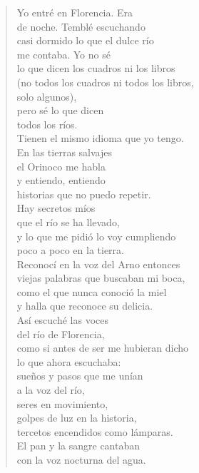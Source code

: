 \documentclass[12pt]{article}
\begin{document}
\clearpage
{}
\begin{verse}

Yo entré en Florencia. Era\\
de noche. Temblé escuchando\\
casi dormido lo que el dulce río\\
me contaba. Yo no sé\\
lo que dicen los cuadros ni los libros\\
(no todos los cuadros ni todos los libros,\\
solo algunos),\\
pero sé lo que dicen\\
todos los ríos.\\
Tienen el mismo idioma que yo tengo.\\
En las tierras salvajes\\
el Orinoco me habla\\
y entiendo, entiendo\\
historias que no puedo repetir.\\
Hay secretos míos\\
que el río se ha llevado,\\
y lo que me pidió lo voy cumpliendo\\
poco a poco en la tierra.\\
Reconocí en la voz del Arno entonces\\
viejas palabras que buscaban mi boca,\\
como el que nunca conoció la miel\\
y halla que reconoce su delicia.\\
Así escuché las voces\\
del río de Florencia,\\
como si antes de ser me hubieran dicho\\
lo que ahora escuchaba:\\
sueños y pasos que me unían\\
a la voz del río,\\
seres en movimiento,\\
golpes de luz en la historia,\\
tercetos encendidos como lámparas.\\
El pan y la sangre cantaban\\
con la voz nocturna del agua.  

\end{verse}
\end{document}
